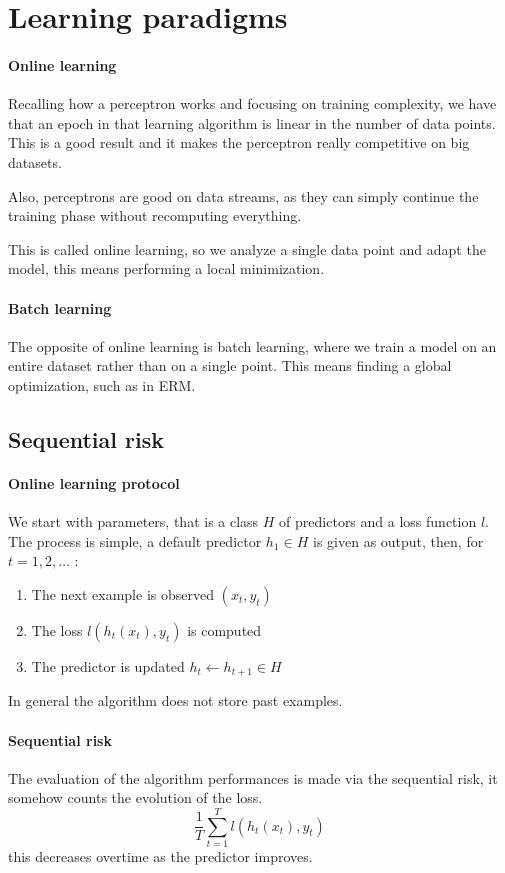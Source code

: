 \section{Learning paradigms}

\paragraph{Online learning}
Recalling how a perceptron works and focusing on training 
complexity, we have that an epoch in that learning algorithm is 
linear in the number of data points.
This is a good result and it makes the perceptron really competitive 
on big datasets. 

Also, perceptrons are good on data streams, as they can simply continue
the training phase without recomputing everything.

This is called online learning, so we analyze a single data point 
and adapt the model, this means performing a local minimization.

\paragraph{Batch learning}
The opposite of online learning is batch learning, where we train 
a model on an entire dataset rather than on a single point. 
This means finding a global optimization, such as in ERM.

\subsection{Sequential risk}

\paragraph{Online learning protocol}
We start with parameters, that is a class $H$ of predictors and 
a loss function $l$. 
The process is simple, a default predictor $h_1 \in H$ is given as output, 
then, for $t = 1, 2, \dots$ :
\begin{enumerate}
    \item The next example is observed $(x_t, y_t)$
    \item The loss $l(h_t(x_t), y_t)$ is computed
    \item The predictor is updated $h_t \gets h_{t+1} \in H$
\end{enumerate}
In general the algorithm does not store past examples.

\paragraph{Sequential risk}
The evaluation of the algorithm performances is made via the sequential 
risk, it somehow counts the evolution of the loss.
$$\frac{1}{T}\sum_{t=1}^T l(h_t(x_t), y_t)$$
this decreases overtime as the predictor improves.

